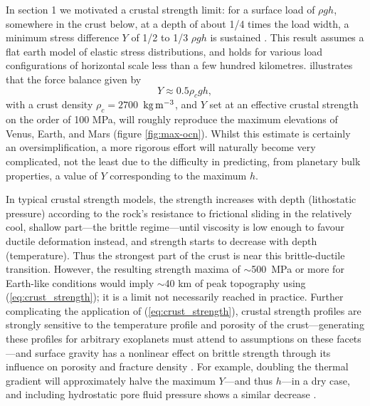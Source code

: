 \documentclass[trackchanges]{aastex63}
\begin{document}
In section 1 we motivated a crustal strength limit: for a surface load of $\rho g h$, somewhere in the crust below, at a depth of about 1/4 times the load width, a minimum stress difference $Y$ of 1/2 to 1/3 $\rho g h$ is sustained \citep{jeffreys_earth_1929}. This result assumes a flat earth model of elastic stress distributions, and holds for various load configurations of horizontal scale less than a few hundred kilometres. \citet{melosh_planetary_2011} illustrates that the force balance given by
\begin{equation}\label{eq:crust_strength}
    Y \approx 0.5 \rho_c g h,
\end{equation}
with a crust density $\rho_c = 2700$~$\rm{kg\,m^{-3}}$, and $Y$ set at an effective crustal strength on the order of 100 MPa, will roughly reproduce the maximum elevations of Venus, Earth, and Mars (figure \ref{fig:max-ocn}). Whilst this estimate is certainly an oversimplification, a more rigorous effort will naturally become very complicated, not the least due to the difficulty in predicting, from planetary bulk properties, a value of $Y$ corresponding to the maximum $h$.%


In typical crustal strength models, the strength increases with depth (lithostatic pressure) according to the rock's resistance to frictional sliding in the relatively cool, shallow part---the brittle regime---until viscosity is low enough to favour ductile deformation instead, and strength starts to decrease with depth (temperature). Thus the strongest part of the crust is near this brittle-ductile transition. However, the resulting strength maxima of $\sim$500~MPa or more for Earth-like conditions \citep{katayama_strength_2021} would imply $\sim$40 km of peak topography using (\ref{eq:crust_strength}); it is a limit not necessarily reached in practice. Further complicating the application of (\ref{eq:crust_strength}), crustal strength profiles are strongly sensitive to the temperature profile and porosity of the crust---generating these profiles for arbitrary exoplanets must attend to assumptions on these facets \citep{byrne_effects_2021}---and surface gravity has a nonlinear effect on brittle strength through its influence on porosity and fracture density \citep{heap_low_2017}. For example, doubling the thermal gradient will approximately halve the maximum $Y$---and thus $h$---in a dry case, and including hydrostatic pore fluid pressure shows a similar decrease \citep{katayama_strength_2021}.
\end{document}
